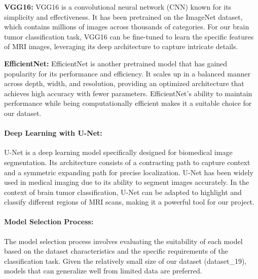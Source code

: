 \textbf{VGG16:} VGG16 is a convolutional neural network (CNN) known for its simplicity and effectiveness. It has been pretrained on the ImageNet dataset, which contains millions of images across thousands of categories. For our brain tumor classification task, VGG16 can be fine-tuned to learn the specific features of MRI images, leveraging its deep architecture to capture intricate details.

\textbf{EfficientNet:} EfficientNet is another pretrained model that has gained popularity for its performance and efficiency. It scales up in a balanced manner across depth, width, and resolution, providing an optimized architecture that achieves high accuracy with fewer parameters. EfficientNet's ability to maintain performance while being computationally efficient makes it a suitable choice for our dataset.

\paragraph{Deep Learning with U-Net:}
U-Net is a deep learning model specifically designed for biomedical image segmentation. Its architecture consists of a contracting path to capture context and a symmetric expanding path for precise localization. U-Net has been widely used in medical imaging due to its ability to segment images accurately. In the context of brain tumor classification, U-Net can be adapted to highlight and classify different regions of MRI scans, making it a powerful tool for our project.

\paragraph{Model Selection Process:}
The model selection process involves evaluating the suitability of each model based on the dataset characteristics and the specific requirements of the classification task. Given the relatively small size of our dataset (dataset\_19), models that can generalize well from limited data are preferred. 


